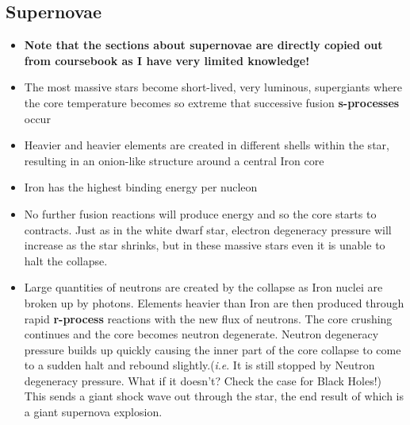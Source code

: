 \documentclass{article}
\newcommand{\ie}{\textit{i}.\textit{e}. }
\begin{document}
\subsection{Supernovae}
\begin{itemize}
\item \textbf{Note that the sections about supernovae are directly copied out from coursebook as I have very limited knowledge!}
\item The most massive stars become short-lived, very luminous, supergiants where the core temperature becomes so extreme that successive fusion \textbf{s-processes} occur
\item Heavier and heavier elements are created in different shells within the star, resulting in an onion-like structure around a central Iron core
\item Iron has the highest binding energy per nucleon
\item No further fusion reactions will produce energy and so the core starts to contracts. Just as in the white dwarf star, electron degeneracy pressure will increase as the star shrinks, but in these massive stars even it is unable to halt the collapse.
\item Large quantities of neutrons are created by the collapse as Iron nuclei are broken up by photons. Elements heavier than Iron are then produced through rapid \textbf{r-process} reactions with the new flux of neutrons. The core crushing continues and the core becomes neutron degenerate. Neutron degeneracy pressure builds up quickly causing the inner part of the core collapse to come to a sudden halt and rebound slightly.(\ie  It is still stopped by Neutron degeneracy pressure. What if it doesn't? Check the case for Black Holes!) This sends a giant shock wave out through the star, the end result of which is a giant supernova explosion.
\end{itemize}
\end{document}
